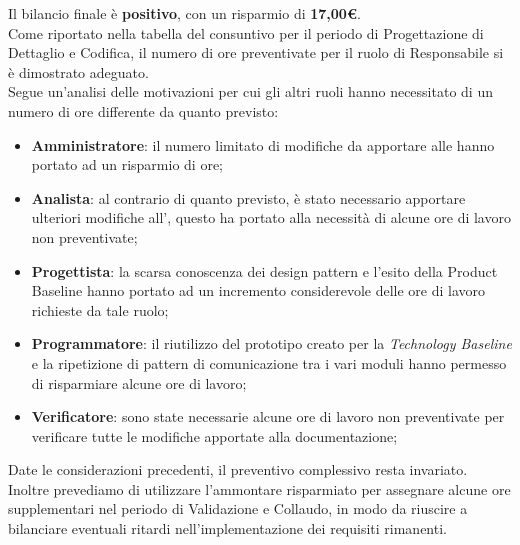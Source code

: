 	Il bilancio finale è \textbf{positivo}, con un risparmio di \textbf{17,00\euro}. \\ Come riportato nella tabella del consuntivo per il periodo di Progettazione di Dettaglio e Codifica, il numero di ore preventivate per il ruolo di Responsabile si è dimostrato adeguato. \\ Segue un'analisi delle motivazioni per cui gli altri ruoli hanno necessitato di un numero di ore differente da quanto previsto: 
	\begin{itemize}
		\item \textbf{Amministratore}: il numero limitato di modifiche da apportare alle \NdP hanno portato ad un risparmio di ore;
		\item \textbf{Analista}: al contrario di quanto previsto, è stato necessario apportare ulteriori modifiche all'\AdR, questo ha portato alla necessità di alcune ore di lavoro non preventivate;
		\item \textbf{Progettista}: la scarsa conoscenza dei design pattern e l'esito della Product Baseline hanno portato ad un incremento considerevole delle ore di lavoro richieste da tale ruolo;
		\item \textbf{Programmatore}: il riutilizzo del prototipo creato per la \textit{Technology Baseline} e la ripetizione di pattern di comunicazione tra i vari moduli hanno permesso di risparmiare alcune ore di lavoro;
		\item \textbf{Verificatore}: sono state necessarie alcune ore di lavoro non preventivate per verificare tutte le modifiche apportate alla documentazione;
	\end{itemize}
	
	Date le considerazioni precedenti, il preventivo complessivo resta invariato. Inoltre prevediamo di utilizzare l'ammontare risparmiato per assegnare alcune ore supplementari nel periodo di Validazione e Collaudo, in modo da riuscire a bilanciare eventuali ritardi nell'implementazione dei requisiti rimanenti. 
	
	